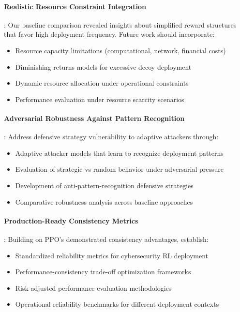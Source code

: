 \documentclass[12pt,oneside]{article}
\begin{document}
\paragraph{Realistic Resource Constraint Integration}: Our baseline comparison revealed insights about simplified reward structures that favor high deployment frequency. Future work should incorporate:
\begin{itemize}
\item Resource capacity limitations (computational, network, financial costs)
\item Diminishing returns models for excessive decoy deployment
\item Dynamic resource allocation under operational constraints
\item Performance evaluation under resource scarcity scenarios
\end{itemize}

\paragraph{Adversarial Robustness Against Pattern Recognition}: Address defensive strategy vulnerability to adaptive attackers through:
\begin{itemize}
\item Adaptive attacker models that learn to recognize deployment patterns
\item Evaluation of strategic vs random behavior under adversarial pressure
\item Development of anti-pattern-recognition defensive strategies
\item Comparative robustness analysis across baseline approaches
\end{itemize}

\paragraph{Production-Ready Consistency Metrics}: Building on PPO's demonstrated consistency advantages, establish:
\begin{itemize}
\item Standardized reliability metrics for cybersecurity RL deployment
\item Performance-consistency trade-off optimization frameworks
\item Risk-adjusted performance evaluation methodologies
\item Operational reliability benchmarks for different deployment contexts
\end{itemize}
\end{document}
